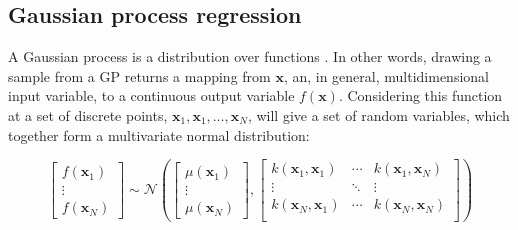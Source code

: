 \subsection{Gaussian process regression}\label{subsec:gp}

A Gaussian process  is a distribution over functions \cite{rasmussenGaussianProcessesMachine2006}.  In other words, drawing a sample from a GP returns a mapping from $\mathbf{x}$, an, in general, multidimensional input variable, to a continuous output variable $f(\mathbf{x})$. Considering this function at a set of discrete points, $\mathbf{x}_{1}, \mathbf{x}_{1},\ldots, \mathbf{x}_{N}$, will give a set of random variables, which together form a multivariate normal distribution: 

\begin{equation}
\begin{bmatrix}  f\left(\mathbf{x}_{1}\right) \\ \vdots \\ f\left(\mathbf{x}_{N}\right) \end{bmatrix} 
\sim 
\mathcal{N}\left( 
\begin{bmatrix} \mu\left(\mathbf{x}_{1}\right) \\  \vdots \\ \mu\left(\mathbf{x}_{N}\right) \end{bmatrix}, 
\begin{bmatrix}
k(\mathbf{x}_{1}, \mathbf{x}_{1}) & \cdots & k(\mathbf{x}_{1}, \mathbf{x}_{N}) \\
\vdots & \ddots & \vdots \\
k(\mathbf{x}_{N}, \mathbf{x}_{1}) & \cdots & k(\mathbf{x}_{N}, \mathbf{x}_{N}) \\
\end{bmatrix}
\right)\label{eqn:msm_mvn}
\end{equation}

